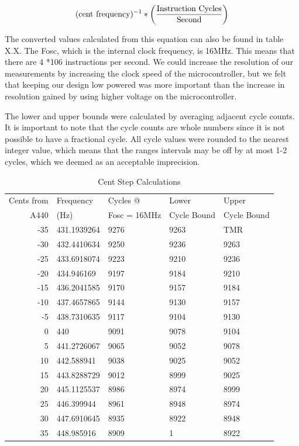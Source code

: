 \documentclass[12pt]{article}
\begin{document}
\begin{equation}
(\mbox{cent frequency})^{-1} * \left({ \mbox{Instruction Cycles} \over \mbox{Second}}\right)
\end{equation}

The converted values calculated from this equation can also be found in table X.X. The Fosc, which is the
internal clock frequency, is 16MHz. This means that there are 4 *106 instructions per second. We could
increase the resolution of our measurements by increasing the clock speed of the microcontroller, but
we felt that keeping our design low powered was more important than the increase in resolution gained
by using higher voltage on the microcontroller.

The lower and upper bounds were calculated by averaging adjacent cycle counts. It is important to
note that the cycle counts are whole numbers since it is not possible to have a fractional cycle. All cycle
values were rounded to the nearest integer value, which means that the ranges intervals may be off by
at most 1-2 cycles, which we deemed as an acceptable imprecision.

\begin{table}
   \centering
    \begin{tabular}{|r|l|l|l|l|}
        \hline
        Cents from & Frequency& Cycles @ & Lower & Upper \\
        A440 & (Hz) & Fosc = 16MHz & Cycle Bound & Cycle Bound \\ \hline
       -35 & 431.1939264 & 9276 & 9263 & TMR \\ \hline
       -30 & 432.4410634 & 9250 & 9236 & 9263 \\ \hline
       -25 & 433.6918074 & 9223 & 9210 & 9236 \\ \hline
       -20 & 434.946169 & 9197 & 9184 & 9210 \\ \hline
       -15 & 436.2041585 & 9170 & 9157 & 9184 \\ \hline
       -10 & 437.4657865 & 9144 & 9130 & 9157 \\ \hline
       -5 & 438.7310635 & 9117 & 9104 & 9130 \\ \hline
       0 & 440 & 9091 & 9078 & 9104 \\ \hline
       5 & 441.2726067 & 9065 & 9052 & 9078 \\ \hline
       10 & 442.588941 & 9038 & 9025 & 9052 \\ \hline
       15 & 443.8288729 & 9012 & 8999 & 9025 \\ \hline
       20 & 445.1125537 & 8986 & 8974 & 8999 \\ \hline
       25 & 446.399944 & 8961 & 8948 & 8974 \\ \hline
       30 & 447.6910645 & 8935 & 8922 & 8948 \\ \hline
       35 & 448.985916 & 8909 & 1 & 8922 \\ \hline
    \end{tabular}
	\caption{Cent Step Calculations}
	\label{Freq_Table} 
\end{table}
\end{document}
